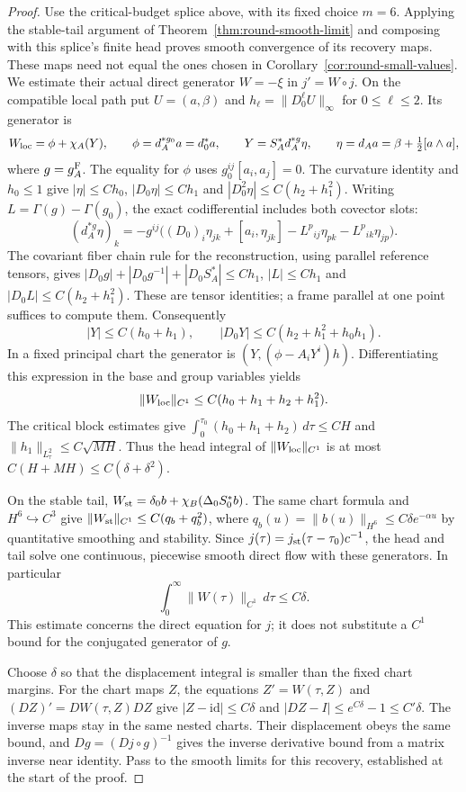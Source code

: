 \documentclass[11pt]{article}
\numberwithin{equation}{section}
\theoremstyle{definition}
\theoremstyle{remark}
\begin{document}
\begin{proof}
Use the critical-budget splice above, with its fixed
choice $m=6$. Applying the stable-tail argument of
Theorem~\ref{thm:round-smooth-limit} and composing with
this splice's finite head proves smooth convergence
of its recovery maps. These maps need not equal the
ones chosen in Corollary~\ref{cor:round-small-values}.
We estimate their actual direct generator $W=-\xi$
in $j'=W\circ j$.
On the compatible local path put
$U=(a,\beta)$ and $h_\ell=\|D_0^\ell U\|_\infty$
for $0\le\ell\le2$. Its generator is
\[
 W_{\rm loc}=\phi+\chi_A(Y),\qquad
 \phi=d_A^{*g_0}a=d_0^*a,\qquad
 Y=S_A^*d_A^{*g}\eta,\qquad
 \eta=d_Aa=\beta+\tfrac12[a\wedge a],
\]
where $g=g_A^{\rm F}$. The equality for $\phi$ uses
$g_0^{ij}[a_i,a_j]=0$.
The curvature identity and $h_0\le1$ give
$|\eta|\le Ch_0$, $|D_0\eta|\le Ch_1$ and
$|D_0^2\eta|\le C(h_2+h_1^2)$.
Writing $L=\Gamma(g)-\Gamma(g_0)$, the exact
codifferential includes both covector slots:
\[
 (d_A^{*g}\eta)_k=-g^{ij}
 \bigl((D_0)_i\eta_{jk}+[a_i,\eta_{jk}]
       -L^p{}_{ij}\eta_{pk}-L^p{}_{ik}\eta_{jp}\bigr).
\]
The covariant fiber chain rule for the reconstruction,
using parallel reference tensors, gives
$|D_0g|+|D_0g^{-1}|+|D_0S_A^*|\le Ch_1$,
$|L|\le Ch_1$ and
$|D_0L|\le C(h_2+h_1^2)$.
These are tensor identities; a frame parallel at
one point suffices to compute them.
Consequently
\[
 |Y|\le C(h_0+h_1),\qquad
 |D_0Y|\le C(h_2+h_1^2+h_0h_1).
\]
In a fixed principal chart the generator is
$(Y,(\phi-A_iY^i)h)$. Differentiating this expression
in the base and group variables yields
\[
 \|W_{\rm loc}\|_{C^1}
       \le C(h_0+h_1+h_2+h_1^2).
\]
The critical block estimates give
$\int_0^{\tau_0}(h_0+h_1+h_2)\,d\tau\le CH$
and $\|h_1\|_{L^2_\tau}\le C\sqrt{MH}$.
Thus the head integral of $\|W_{\rm loc}\|_{C^1}$
is at most $C(H+MH)\le C(\delta+\delta^2)$.

On the stable tail,
$W_{\rm st}=\delta_0b+\chi_B(\Delta_0S_0^*b)$.
The same chart formula and $H^6\hookrightarrow C^3$
give $\|W_{\rm st}\|_{C^1}\le C(q_b+q_b^2)$,
where
$q_b(u)=\|b(u)\|_{H^6}\le C\delta e^{-\alpha u}$
by quantitative smoothing and stability.
Since $j(\tau)=j_{\rm st}(\tau-\tau_0)c^{-1}$,
the head and tail solve one continuous, piecewise
smooth direct flow with these generators. In
particular
\[
 \int_0^\infty\|W(\tau)\|_{C^1}\,d\tau\le C\delta .
\]
This estimate concerns the direct equation for $j$;
it does not substitute a $C^1$ bound for the
conjugated generator of $g$.

Choose $\delta$ so that the displacement integral
is smaller than the fixed chart margins.
For the chart maps $Z$, the equations
$Z'=W(\tau,Z)$ and $(DZ)'=DW(\tau,Z)DZ$
give $|Z-\mathrm{id}|\le C\delta$ and
$|DZ-I|\le e^{C\delta}-1\le C'\delta$.
The inverse maps stay in the same nested charts.
Their displacement obeys the same bound, and
$Dg=(Dj\circ g)^{-1}$ gives the inverse derivative
bound from a matrix inverse near identity.
Pass to the smooth limits for this recovery,
established at the start of the proof.
\end{proof}
\end{document}
